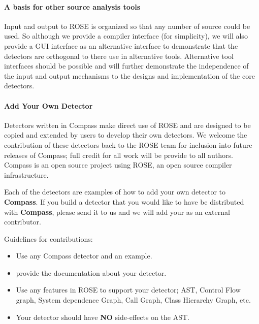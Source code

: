 \paragraph{A basis for other source analysis tools}
   Input and output to ROSE is organized so that any number of source could be used.
So although we provide a compiler interface (for simplicity), we will also provide a 
GUI interface as an alternative interface to demonstrate that the detectors are orthogonal
to there use in alternative tools.  Alternative tool interfaces should be possible 
and will further demonstrate the independence of the input and output mechanisms to
the designs and implementation of the core detectors.

\paragraph{Add Your Own Detector}

    Detectors written in Compass make direct use of ROSE and are 
designed to be copied and extended by users to develop their own 
detectors. We welcome the contribution of these detectors back to 
the ROSE team for inclusion into future releases of Compass;
full credit for all work will be provide to all authors.
Compass is an open source project using ROSE, an open source
compiler infrastructure.

    Each of the detectors are examples of how to
add your own detector to {\bf Compass}.  If you
build a detector that you would like to have be 
distributed with {\bf Compass}, please send it to
us and we will add your as an external contributor.

  Guidelines for contributions:
\begin{itemize}
   \item Use any Compass detector and an example.
   \item provide the documentation about your detector.
   \item Use any features in ROSE to support your detector; AST, Control Flow graph,
    System dependence Graph, Call Graph, Class Hierarchy Graph, etc.
   \item Your detector should have {\bf NO} side-effects on the AST.
\end{itemize}

